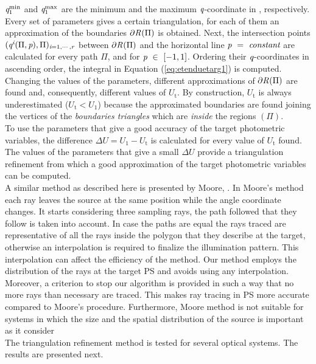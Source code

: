 $\textit{q}_1^{\textrm{min}}$ and $\textit{q}_1^{\textrm{max}}$ are the minimum and the maximum $\textit{q}$-coordinate in , respectively. Every set of parameters gives a certain triangulation, for each of them an approximation of the boundaries $\partial\mbox{$\emph{R}_{\textit{}}$}(\Pi)$ is obtained.
Next, the intersection points $(\textit{q}^{\textit{i}}( \Pi, \textit{p}), \Pi)_{\textit{i} = 1, \cdots, \textit{r}}$ between $\partial\mbox{$\emph{R}_{\textit{}}$}(\Pi)$
and the horizontal line $\textit{p}~=~ \textit{constant}$ are calculated for every path $\Pi$, and for $\textit{p}~\in~[-1,1]$. Ordering their $\textit{q}$-coordinates in ascending order, the integral in Equation (\ref{eq:etenduetarg1}) is computed.
Changing the values of the parameters, different approximations of $\partial\mbox{$\emph{R}_{\textit{}}$}(\Pi)$ are found and, consequently, different values of $U_{\textrm{t}}$. By construction, $U_{\textrm{t}}$ is always underestimated ($U_{\textrm{t}}<U_1$) because the approximated boundaries are found joining the vertices of the \textit{boundaries triangles} which are \textit{inside} the regions $(\Pi)$.
\\ \indent To use the parameters that give a good accuracy of the target photometric variables, the difference $\Delta U = U_1-U_{\textrm{t}}$ is calculated for every value of $U_{\textrm{t}}$ found. The values of the parameters that give a small $\Delta U$ provide a triangulation refinement from which a good approximation of the target photometric variables can be computed.
\\ \indent A similar method as described here is presented by Moore, \cite{moore2013methods}. In Moore's method each ray leaves the source at the same position while the angle coordinate changes. It starts considering three sampling rays, the path followed that they follow is taken into account. In case the paths are equal the rays traced are representative of all the rays inside the polygon that they describe at the target, otherwise an interpolation is required to finalize the illumination pattern. This interpolation can affect the efficiency of the method. Our method employs the distribution of the rays at the target PS and avoids using any interpolation. Moreover, a criterion to stop our algorithm is provided in such a way that no more rays than necessary are traced. This makes ray tracing in PS more accurate compared to Moore's procedure. Furthermore, Moore method is not suitable for systems in which the size and the spatial distribution of the source is important as it consider \\ \indent
The triangulation refinement method is tested for several optical systems. The results are presented next.
